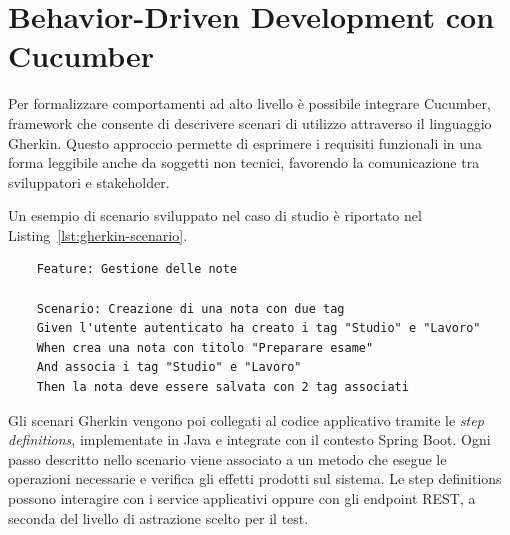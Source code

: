\section{Behavior-Driven Development con Cucumber}
\label{sec:bdd-cucumber}

Per formalizzare comportamenti ad alto livello è possibile integrare Cucumber, framework che consente di descrivere scenari di utilizzo attraverso il linguaggio Gherkin. Questo approccio permette di esprimere i requisiti funzionali in una forma leggibile anche da soggetti non tecnici, favorendo la comunicazione tra sviluppatori e stakeholder.

Un esempio di scenario sviluppato nel caso di studio è riportato nel Listing~\ref{lst:gherkin-scenario}.

\captionsetup{type=listing}
\label{lst:gherkin-scenario}
\begin{verbatim}
	Feature: Gestione delle note
	
	Scenario: Creazione di una nota con due tag
	Given l'utente autenticato ha creato i tag "Studio" e "Lavoro"
	When crea una nota con titolo "Preparare esame"
	And associa i tag "Studio" e "Lavoro"
	Then la nota deve essere salvata con 2 tag associati
\end{verbatim}

Gli scenari Gherkin vengono poi collegati al codice applicativo tramite le \textit{step definitions}, implementate in Java e integrate con il contesto Spring Boot. Ogni passo descritto nello scenario viene associato a un metodo che esegue le operazioni necessarie e verifica gli effetti prodotti sul sistema. Le step definitions possono interagire con i service applicativi oppure con gli endpoint REST, a seconda del livello di astrazione scelto per il test.

